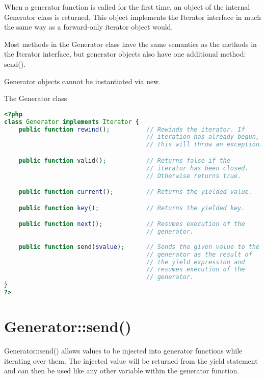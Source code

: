 When a generator function is called for the first time, an object of the internal Generator class is returned. This object implements the Iterator interface in much the same way as a forward-only iterator object would.

Most methods in the Generator class have the same semantics as the methods in the Iterator interface, but generator objects also have one additional method: send().

Generator objects cannot be instantiated via new.



\begin{example}
The Generator class
\begin{lstlisting}[language=PHP]
<?php
class Generator implements Iterator {
    public function rewind();          // Rewinds the iterator. If
                                       // iteration has already begun,
                                       // this will throw an exception.

    public function valid();           // Returns false if the
                                       // iterator has been closed.
                                       // Otherwise returns true.

    public function current();         // Returns the yielded value.

    public function key();             // Returns the yielded key.

    public function next();            // Resumes execution of the
                                       // generator.
    
    public function send($value);      // Sends the given value to the
                                       // generator as the result of
                                       // the yield expression and
                                       // resumes execution of the
                                       // generator.
}
?>
\end{lstlisting}
\end{example}


\section{Generator::send()}

Generator::send() allows values to be injected into generator functions while iterating over them. The injected value will be returned from the yield statement and can then be used like any other variable within the generator function.


